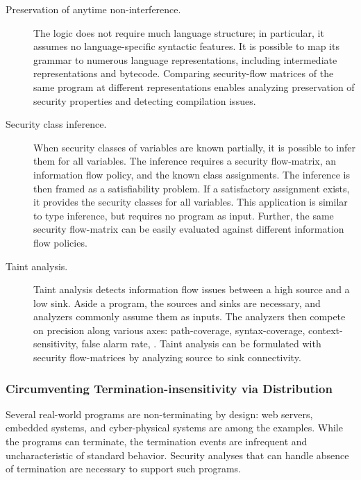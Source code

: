 \begin{description}
\item[Preservation of anytime non-interference.]
The \lname logic does not
require much language structure; in particular, it assumes no language-specific
syntactic features. It is possible to map its grammar to numerous language
representations, including intermediate representations and bytecode. Comparing
security-flow matrices of the same program at different representations enables
analyzing preservation of security properties and detecting compilation issues.

\item[Security class inference.]
When security classes of variables are known partially, it is possible to infer
them for all variables. The inference requires a security flow-matrix, an
information flow policy, and the known class assignments. The inference is then
framed as a satisfiability problem. If a satisfactory assignment exists, it
provides the security classes for all variables. This application is similar to
type inference, but requires no program as input. Further, the same security
flow-matrix can be easily evaluated against different information flow policies.

\item[Taint analysis.]
Taint analysis detects information flow issues between a high source and a low
sink. Aside a program, the sources and sinks are necessary, and analyzers
commonly assume them as inputs. The analyzers then compete on precision along
various axes: path-coverage, syntax-coverage, context-sensitivity, false alarm
rate, \etc. Taint analysis can be formulated with security flow-matrices by
analyzing source to sink connectivity.
\end{description}

\subsubsection{Circumventing Termination-insensitivity via Distribution}
\label{subsub:termination}

Several real-world programs are non-terminating by design: web servers, embedded
systems, and cyber-physical systems are among the examples. While the programs
can terminate, the termination events are infrequent and uncharacteristic of
standard behavior. Security analyses that can handle absence of termination are
necessary to support such programs.


